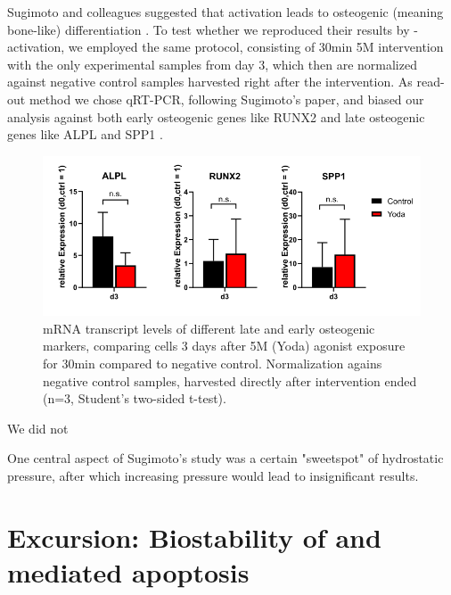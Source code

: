 Sugimoto and colleagues suggested that \Piezo{} activation leads to osteogenic (meaning bone-like) differentiation \cite{Sugimoto2017}. To test whether we reproduced their results by \Piezo{}-activation, we employed the same protocol, consisting of 30min 5\textmu{}M \Yoda{} intervention with the only experimental samples from day 3, which then are normalized against negative control samples harvested right after the intervention. As read-out method we chose qRT-PCR, following Sugimoto's paper, and biased our analysis against both early osteogenic genes like RUNX2 and late osteogenic genes like ALPL and SPP1 \cite{Marom2005, Creecy2013}. \par


\begin{figure}[htbp]
	\centering
	\includegraphics[width = \linewidth]{Osteogenic_PCR_Yoda.png}
	\caption{mRNA transcript levels of different late and early osteogenic markers, comparing cells 3 days after 5\textmu{}M (Yoda) \Piezo{} agonist exposure for 30min compared to negative control. Normalization agains negative control samples, harvested directly after intervention ended (n=3, Student's two-sided t-test).}
	\label{fig:Osteo_PCR}
\end{figure}
 

We did not 

One central aspect of Sugimoto's study was a certain "sweetspot" of hydrostatic pressure, after which increasing pressure would lead to insignificant results.



\section{Excursion: Biostability of \Yoda{} and \Piezo{} mediated apoptosis}
\label{sec:biostability}


